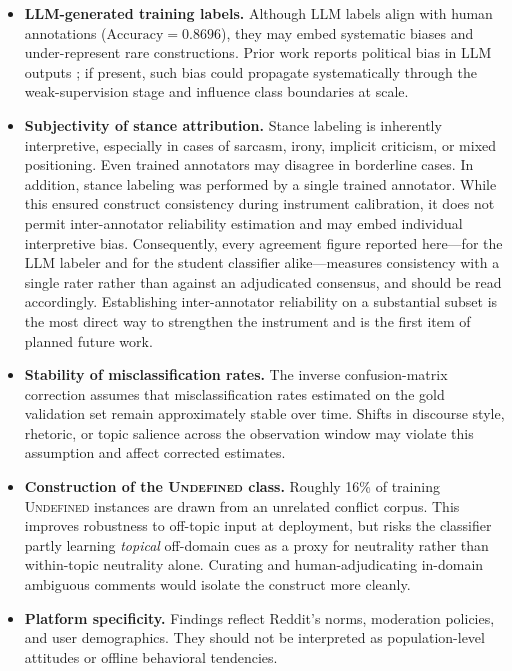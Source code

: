\documentclass[letterpaper]{article} %
\begin{document}
\begin{itemize}
\item \textbf{LLM-generated training labels.} Although LLM labels align with human annotations ($\text{Accuracy}=0.8696$), they may embed systematic biases and under-represent rare constructions. Prior work reports political bias in LLM outputs \cite{ali2025social}; if present, such bias could propagate systematically through the weak-supervision stage and influence class boundaries at scale.

\item \textbf{Subjectivity of stance attribution.} Stance labeling is inherently interpretive, especially in cases of sarcasm, irony, implicit criticism, or mixed positioning. Even trained annotators may disagree in borderline cases. In addition, stance labeling was performed by a single trained annotator. While this ensured construct consistency during instrument calibration, it does not permit inter-annotator reliability estimation and may embed individual interpretive bias. Consequently, every agreement figure reported here---for the LLM labeler and for the student classifier alike---measures consistency with a single rater rather than against an adjudicated consensus, and should be read accordingly. Establishing inter-annotator reliability on a substantial subset is the most direct way to strengthen the instrument and is the first item of planned future work.

\item \textbf{Stability of misclassification rates.} The inverse confusion-matrix correction assumes that misclassification rates estimated on the gold validation set remain approximately stable over time. Shifts in discourse style, rhetoric, or topic salience across the observation window may violate this assumption and affect corrected estimates.

\item \textbf{Construction of the \textsc{Undefined} class.} Roughly 16\% of training \textsc{Undefined} instances are drawn from an unrelated conflict corpus. This improves robustness to off-topic input at deployment, but risks the classifier partly learning \emph{topical} off-domain cues as a proxy for neutrality rather than within-topic neutrality alone. Curating and human-adjudicating in-domain ambiguous comments would isolate the construct more cleanly.

\item \textbf{Platform specificity.} Findings reflect Reddit’s norms, moderation policies, and user demographics. They should not be interpreted as population-level attitudes or offline behavioral tendencies.


\end{itemize}
\end{document}
